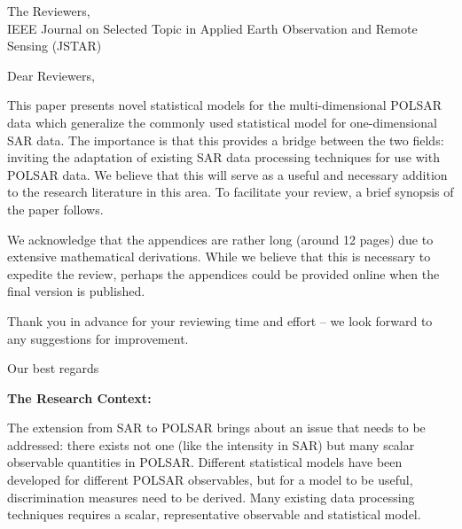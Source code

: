 \documentclass{letter}
\begin{document}
 
\begin{letter}{The Reviewers,\\IEEE Journal on Selected Topic in Applied Earth Observation and Remote Sensing (JSTAR)}
\opening{Dear Reviewers,}





This paper presents novel statistical models for the multi-dimensional POLSAR data which generalize the commonly used statistical model for one-dimensional SAR data. The importance is that this provides a bridge between the two fields: inviting the adaptation of existing SAR data processing techniques for use with POLSAR data. We believe that this will serve as a useful and necessary addition to the research literature in this area.
To facilitate your review, a brief synopsis of the paper follows.

We acknowledge that the appendices are rather long (around 12 pages) due to extensive mathematical derivations. While we believe that this is necessary to expedite the review, perhaps the appendices could be provided online when the final version is published.

Thank you in advance for your reviewing time and effort -- we look forward to any suggestions for improvement.

\closing{Our best regards}


\newpage
\textbf{The Research Context:}

The extension from SAR to POLSAR brings about an issue that needs to be addressed:
  there exists not one (like the intensity in SAR) but many scalar observable quantities in POLSAR. 
Different statistical models have been developed for different POLSAR observables, 
 but for a model to be useful, discrimination measures need to be derived.
Many existing data processing techniques requires a scalar, representative observable and statistical model.


\end{letter}
\end{document}
